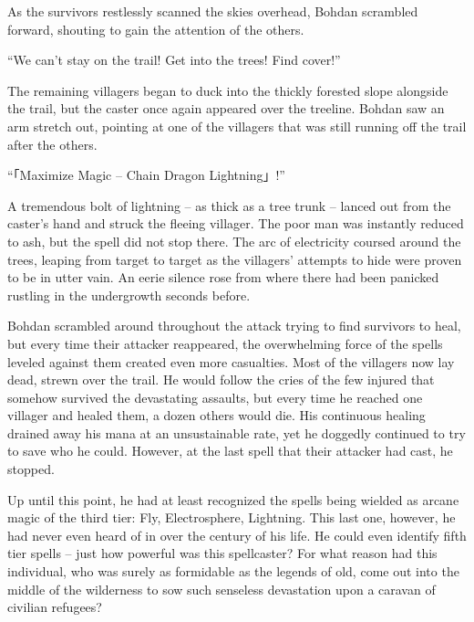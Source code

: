  

As the survivors restlessly scanned the skies overhead, Bohdan scrambled forward, shouting to gain the attention of the others.

 

“We can’t stay on the trail! Get into the trees! Find cover!”

 

The remaining villagers began to duck into the thickly forested slope alongside the trail, but the caster once again appeared over the treeline. Bohdan saw an arm stretch out, pointing at one of the villagers that was still running off the trail after the others.

 

“「Maximize Magic – Chain Dragon Lightning」!”

 

A tremendous bolt of lightning – as thick as a tree trunk – lanced out from the caster’s hand and struck the fleeing villager. The poor man was instantly reduced to ash, but the spell did not stop there. The arc of electricity coursed around the trees, leaping from target to target as the villagers’ attempts to hide were proven to be in utter vain. An eerie silence rose from where there had been panicked rustling in the undergrowth seconds before.

 

Bohdan scrambled around throughout the attack trying to find survivors to heal, but every time their attacker reappeared, the overwhelming force of the spells leveled against them created even more casualties. Most of the villagers now lay dead, strewn over the trail. He would follow the cries of the few injured that somehow survived the devastating assaults, but every time he reached one villager and healed them, a dozen others would die. His continuous healing drained away his mana at an unsustainable rate, yet he doggedly continued to try to save who he could. However, at the last spell that their attacker had cast, he stopped.

 

Up until this point, he had at least recognized the spells being wielded as arcane magic of the third tier: Fly, Electrosphere, Lightning. This last one, however, he had never even heard of in over the century of his life. He could even identify fifth tier spells – just how powerful was this spellcaster? For what reason had this individual, who was surely as formidable as the legends of old, come out into the middle of the wilderness to sow such senseless devastation upon a caravan of civilian refugees?

